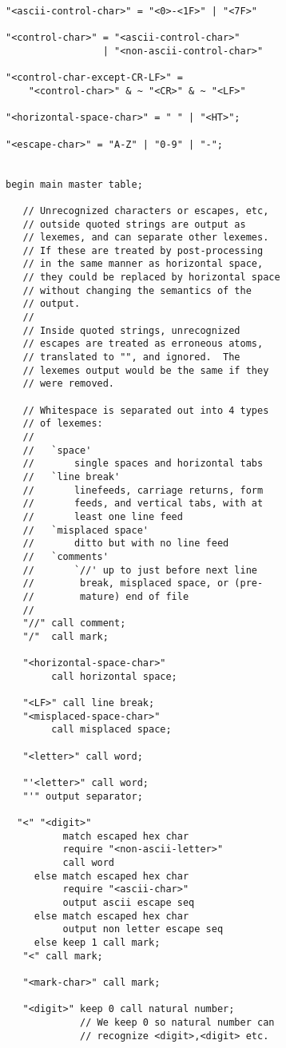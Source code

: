 \documentclass[12pt]{article}
\newenvironment{indpar}[1][0.3in]%
	{\begin{list}{}%
		     {\setlength{\itemsep}{0in}%
		      \setlength{\topsep}{0in}%
		      \setlength{\parsep}{1ex}%
		      \setlength{\labelwidth}{#1}%
		      \setlength{\leftmargin}{#1}%
		      \addtolength{\leftmargin}{\labelsep}}%
	 \item}%
	{\end{list}}
\begin{document}
\begin{indpar}
\begin{verbatim}
"<ascii-control-char>" = "<0>-<1F>" | "<7F>"

"<control-char>" = "<ascii-control-char>"
                 | "<non-ascii-control-char>"

"<control-char-except-CR-LF>" =
    "<control-char>" & ~ "<CR>" & ~ "<LF>"

"<horizontal-space-char>" = " " | "<HT>";

"<escape-char>" = "A-Z" | "0-9" | "-";


begin main master table;

   // Unrecognized characters or escapes, etc,
   // outside quoted strings are output as
   // lexemes, and can separate other lexemes.
   // If these are treated by post-processing
   // in the same manner as horizontal space,
   // they could be replaced by horizontal space
   // without changing the semantics of the
   // output.
   //
   // Inside quoted strings, unrecognized
   // escapes are treated as erroneous atoms,
   // translated to "", and ignored.  The
   // lexemes output would be the same if they
   // were removed.

   // Whitespace is separated out into 4 types
   // of lexemes:
   //
   //   `space'
   //       single spaces and horizontal tabs
   //   `line break'
   //       linefeeds, carriage returns, form
   //       feeds, and vertical tabs, with at
   //       least one line feed
   //   `misplaced space'
   //       ditto but with no line feed
   //   `comments'
   //       `//' up to just before next line
   //        break, misplaced space, or (pre-
   //        mature) end of file
   //
   "//" call comment;
   "/"  call mark;

   "<horizontal-space-char>"
        call horizontal space;

   "<LF>" call line break;
   "<misplaced-space-char>"
        call misplaced space;

   "<letter>" call word;

   "'<letter>" call word;
   "'" output separator;

  "<" "<digit>"
          match escaped hex char
          require "<non-ascii-letter>"
          call word
     else match escaped hex char
          require "<ascii-char>"
          output ascii escape seq
     else match escaped hex char
          output non letter escape seq
     else keep 1 call mark;
   "<" call mark;

   "<mark-char>" call mark;

   "<digit>" keep 0 call natural number;
             // We keep 0 so natural number can
             // recognize <digit>,<digit> etc.


\end{verbatim}
\end{indpar}
\end{document}
